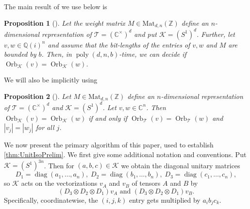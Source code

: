 \documentclass[11pt]{article}
\numberwithin{equation}{section}
\newtheorem*{proposition*}{Proposition}
\theoremstyle{remark}
\DeclareMathOperator{\diag}{diag}
\DeclareMathOperator{\poly}{poly}
\DeclareMathOperator{\Orb}{Orb}
\newcommand{\CC}{\mathbb{C}}
\newcommand{\QQ}{\mathbb{Q}}
\newcommand{\ZZ}{\mathbb{Z}}
\newcommand{\cK}{\mathcal{K}}
\newcommand{\cT}{\mathcal{T}}
\begin{document}
The main result of \cite{burgisser_et_alCCC.2021.32} we use below is

\begin{proposition*}[{\cite[Corollary 1.6]{burgisser_et_alCCC.2021.32}}]
    Let the weight matrix $M \in \text{Mat}_{d, n}(\ZZ)$ define an $n$-dimensional representation of $\cT = (\CC^\times)^d$ and put $\cK = (S^1)^d$. Further, let $v, w \in \QQ(i)^n$ and assume that the bit-lengths of the entries of $v, w$ and $M$ are bounded by $b$. Then, in $\poly(d, n, b)$-time, we can decide if $\Orb_{\cK}(v) = \Orb_\cK(w)$.
\end{proposition*}

We will also be implicitly using

\begin{proposition*}[{\cite[Proposition 8.1]{burgisser_et_alCCC.2021.32}}]
    Let $M \in \text{Mat}_{d, n}(\ZZ)$ define an $n$-dimensional representation of $\cT = (\CC^\times)^d$ and $\cK = (S^1)^d$. Let $v, w \in \CC^n$. Then $\Orb_\cK(v) = \Orb_\cK(w)$ if and only if $\Orb_\cT(v) = \Orb_\cT(w)$ and $|v_j| = |w_j|$ for all $j$.
\end{proposition*}

We now present the primary algorithm of this paper, used to establish \cref{thm:UnitIsoPrelim}. We first give some additional notation and conventions. Put $\cK = (S^1)^{3n}$. Then for $(a, b, c) \in \cK$ we obtain the diagonal unitary matrices
\[
D_1 = \diag(a_1,\dots,a_n),\; D_2 = \diag(b_1,\dots,b_n), \; D_3 = \diag(c_1,\dots,c_n),
\]
so $\cK$ acts on the vectorizations $v_A$ and $v_B$ of tensors $A$ and $B$ by
\[
(D_3\otimes D_2 \otimes D_1) v_A \text{ and } (D_3\otimes D_2 \otimes D_1) v_B.
\]
Specifically, coordinatewise, the $(i,j,k)$ entry gets multiplied by $a_ib_jc_k$.
\end{document}
